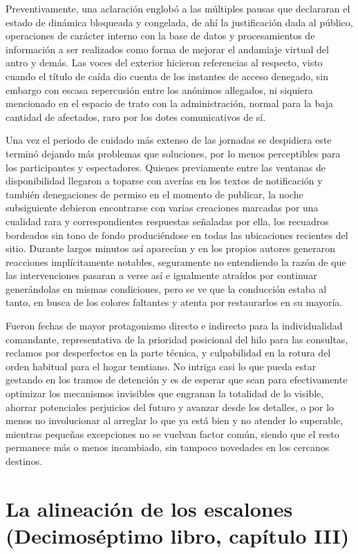 \documentclass[
]{book}
\begin{document}
Preventivamente, una aclaración englobó a las múltiples pausas que declararan el estado de dinámica bloqueada y congelada, de ahí la justificación dada al público, operaciones de carácter interno con la base de datos y procesamientos de información a ser realizados como forma de mejorar el andamiaje virtual del antro y demás. Las voces del exterior hicieron referencias al respecto, visto cuando el título de caída dio cuenta de los instantes de acceso denegado, sin embargo con escasa repercusión entre los anónimos allegados, ni siquiera mencionado en el espacio de trato con la administración, normal para la baja cantidad de afectados, raro por los dotes comunicativos de sí.

Una vez el periodo de cuidado más extenso de las jornadas se despidiera este terminó dejando más problemas que soluciones, por lo menos perceptibles para los participantes y espectadores. Quienes previamente entre las ventanas de disponibilidad llegaron a toparse con averías en los textos de notificación y también denegaciones de permiso en el momento de publicar, la noche subsiguiente debieron encontrarse con varias creaciones marcadas por una cualidad rara y correspondientes respuestas señaladas por ella, los recuadros bordeados sin tono de fondo produciéndose en todas las ubicaciones recientes del sitio. Durante largos minutos así aparecían y en los propios autores generaron reacciones implícitamente notables, seguramente no entendiendo la razón de que las intervenciones pasaran a verse así e igualmente atraídos por continuar generándolas en mismas condiciones, pero se ve que la conducción estaba al tanto, en busca de los colores faltantes y atenta por restaurarlos en su mayoría.

Fueron fechas de mayor protagonismo directo e indirecto para la individualidad comandante, representativa de la prioridad posicional del hilo para las consultas, reclamos por desperfectos en la parte técnica, y culpabilidad en la rotura del orden habitual para el hogar temtiano. No intriga casi lo que pueda estar gestando en los tramos de detención y es de esperar que sean para efectivamente optimizar los mecanismos invisibles que engranan la totalidad de lo visible, ahorrar potenciales perjuicios del futuro y avanzar desde los detalles, o por lo menos no involucionar al arreglar lo que ya está bien y no atender lo superable, mientras pequeñas excepciones no se vuelvan factor común, siendo que el resto permanece más o menos incambiado, sin tampoco novedades en los cercanos destinos.

\hypertarget{la-alineaciuxf3n-de-los-escalones-decimosuxe9ptimo-libro-capuxedtulo-iii}{%
\section{La alineación de los escalones (Decimoséptimo libro, capítulo III)}\label{la-alineaciuxf3n-de-los-escalones-decimosuxe9ptimo-libro-capuxedtulo-iii}}
\end{document}
